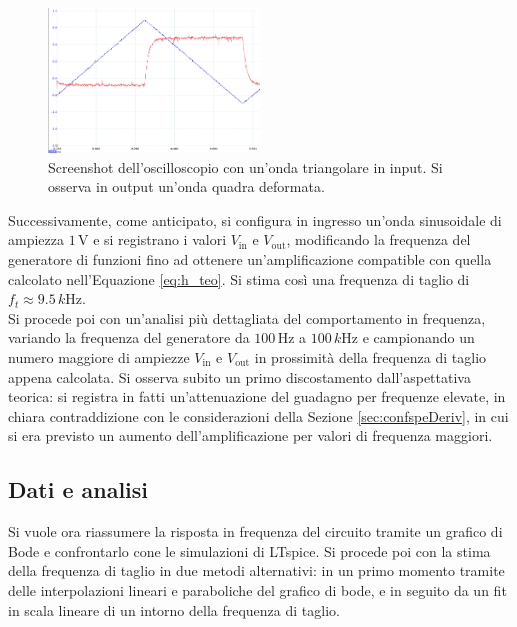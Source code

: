 \documentclass[a4paper,11pt]{article}
\newcommand\V{ \,\si{\volt} }
\begin{document}
\begin{figure}
\centering
\includegraphics[width=0.5\textwidth]{images/screen_deriv}
\caption{\footnotesize Screenshot dell'oscilloscopio con un'onda triangolare in input.
Si osserva in output un'onda quadra deformata.}
\label{fig:screen_deriv}
\end{figure}

\noindent Successivamente, come anticipato, si
configura in ingresso un'onda sinusoidale di ampiezza $1 \V$
e si registrano i valori $V_{\textrm{in}}$ e $V_{\textrm{out}}$, modificando la
frequenza del generatore di funzioni fino ad ottenere un'amplificazione compatible con quella calcolato nell'Equazione \ref{eq:h_teo}.  Si stima così una frequenza di taglio di $f_{t} \approx 9.5 \,\si{k\Hz}$.\\
Si procede poi
con un'analisi più dettagliata del comportamento in frequenza, variando
la frequenza del generatore da $100 \,\si{\Hz}$ a $100 \,\si{k\Hz}$ e campionando un numero maggiore di ampiezze $V_{\text{in}}$ e $V_{\text{out}}$
in prossimità della frequenza di taglio appena calcolata.
Si osserva subito un primo discostamento dall'aspettativa teorica: si registra in fatti un'attenuazione del guadagno per frequenze elevate, in chiara contraddizione con le
considerazioni della Sezione \ref{sec:confspeDeriv}, in cui si era previsto un aumento dell'amplificazione per valori di frequenza maggiori.

\subsection{Dati e analisi}
Si vuole ora riassumere la risposta in frequenza del circuito tramite un grafico di Bode e confrontarlo cone le simulazioni di LTspice. Si procede poi
con la stima della frequenza di taglio in due metodi alternativi: in un primo
momento tramite delle interpolazioni lineari e paraboliche del grafico di bode,
e in seguito da un fit in scala lineare di un intorno della frequenza di taglio.
\end{document}
